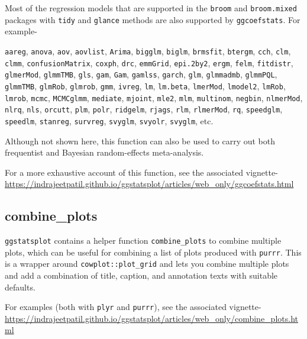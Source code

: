 \documentclass[]{article}
\begin{document}
Most of the regression models that are supported in the \texttt{broom}
and \texttt{broom.mixed} packages with \texttt{tidy} and \texttt{glance}
methods are also supported by \texttt{ggcoefstats}. For example-

\texttt{aareg}, \texttt{anova}, \texttt{aov}, \texttt{aovlist},
\texttt{Arima}, \texttt{bigglm}, \texttt{biglm}, \texttt{brmsfit},
\texttt{btergm}, \texttt{cch}, \texttt{clm}, \texttt{clmm},
\texttt{confusionMatrix}, \texttt{coxph}, \texttt{drc},
\texttt{emmGrid}, \texttt{epi.2by2}, \texttt{ergm}, \texttt{felm},
\texttt{fitdistr}, \texttt{glmerMod}, \texttt{glmmTMB}, \texttt{gls},
\texttt{gam}, \texttt{Gam}, \texttt{gamlss}, \texttt{garch},
\texttt{glm}, \texttt{glmmadmb}, \texttt{glmmPQL}, \texttt{glmmTMB},
\texttt{glmRob}, \texttt{glmrob}, \texttt{gmm}, \texttt{ivreg},
\texttt{lm}, \texttt{lm.beta}, \texttt{lmerMod}, \texttt{lmodel2},
\texttt{lmRob}, \texttt{lmrob}, \texttt{mcmc}, \texttt{MCMCglmm},
\texttt{mediate}, \texttt{mjoint}, \texttt{mle2}, \texttt{mlm},
\texttt{multinom}, \texttt{negbin}, \texttt{nlmerMod}, \texttt{nlrq},
\texttt{nls}, \texttt{orcutt}, \texttt{plm}, \texttt{polr},
\texttt{ridgelm}, \texttt{rjags}, \texttt{rlm}, \texttt{rlmerMod},
\texttt{rq}, \texttt{speedglm}, \texttt{speedlm}, \texttt{stanreg},
\texttt{survreg}, \texttt{svyglm}, \texttt{svyolr}, \texttt{svyglm},
etc.

Although not shown here, this function can also be used to carry out
both frequentist and Bayesian random-effects meta-analysis.

For a more exhaustive account of this function, see the associated
vignette-
\url{https://indrajeetpatil.github.io/ggstatsplot/articles/web_only/ggcoefstats.html}

\hypertarget{combine_plots}{%
\subsection{combine\_plots}\label{combine_plots}}

\texttt{ggstatsplot} contains a helper function \texttt{combine\_plots}
to combine multiple plots, which can be useful for combining a list of
plots produced with \texttt{purrr}. This is a wrapper around
\texttt{cowplot::plot\_grid} and lets you combine multiple plots and add
a combination of title, caption, and annotation texts with suitable
defaults.

For examples (both with \texttt{plyr} and \texttt{purrr}), see the
associated vignette-
\url{https://indrajeetpatil.github.io/ggstatsplot/articles/web_only/combine_plots.html}
\end{document}
